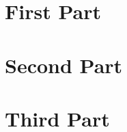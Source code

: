 \documentclass[11pt]{ctexbook}
\begin{document}
\frontmatter


\mainmatter
\part{First Part}


\part{Second Part}


\part{Third Part}


\backmatter







\latexprintindex
\end{document}

